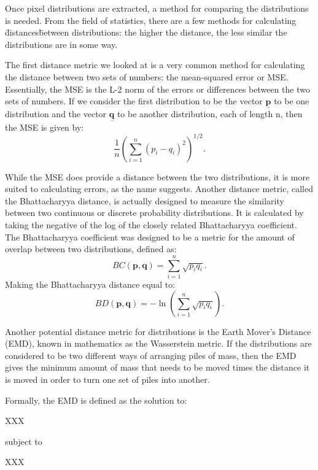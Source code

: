 Once pixel distributions are extracted, a method for comparing the distributions is needed.
From the field of statistics, there are a few methods for calculating \"distances\" between distributions: the higher the distance, the less similar the distributions are in some way.

The first distance metric we looked at is a very common method for calculating the distance between two sets of numbers: the mean-squared error or MSE.
Essentially, the MSE is the L-2 norm of the errors or differences between the two sets of numbers.
If we consider the first distribution to be the vector $\underline{\mathbf{p}}$ to be one distribution and the vector $\underline{\mathbf{q}}$ to be another distribution, each of length n, then the MSE is given by:
\begin{equation}
\frac{1}{n} \left( \sum_{i=1}^n{(p_i-q_i)^2} \right)^{1/2} .
\end{equation}

While the MSE does provide a distance between the two distributions, it is more suited to calculating errors, as the name suggests.
Another distance metric, called the Bhattacharyya distance, is actually designed to measure the similarity between two continuous or discrete probability distributions.
It is calculated by taking the negative of the log of the closely related Bhattacharyya coefficient.
The Bhattacharyya coefficient was designed to be a metric for the amount of overlap between two distributions, defined as:
\begin{equation}
BC(\mathbf{p}, \mathbf{q}) = \sum_{i=1}^n{\sqrt{p_iq_i}} .
\end{equation}
Making the Bhattacharyya distance equal to:
\begin{equation}
BD(\mathbf{p}, \mathbf{q}) = - \ln \left( \sum_{i=1}^n {\sqrt{p_iq_i}} \right) .
\end{equation}

Another potential distance metric for distributions is the Earth Mover's Distance (EMD), known in mathematics as the Wasserstein metric.
If the distributions are considered to be two different ways of arranging piles of mass, then the EMD gives the minimum amount of mass that needs to be moved times the distance it is moved in order to turn one set of piles into another.

Formally, the EMD is defined as the solution to:

XXX

subject to 

XXX


